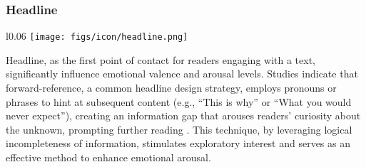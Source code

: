 





\subsubsection{Headline}

\begin{wrapfigure}{l}{0.06\textwidth}
    \texttt{[image: figs/icon/headline.png]}
\end{wrapfigure} 

Headline, as the first point of contact for readers engaging with a text, significantly influence emotional valence and arousal levels. Studies indicate that forward-reference, a common headline design strategy, employs pronouns or phrases to hint at subsequent content (e.g., “This is why” or “What you would never expect”), creating an information gap that arouses readers’ curiosity about the unknown, prompting further reading \cite{blom2015click}. This technique, by leveraging logical incompleteness of information, stimulates exploratory interest and serves as an effective method to enhance emotional arousal. 

